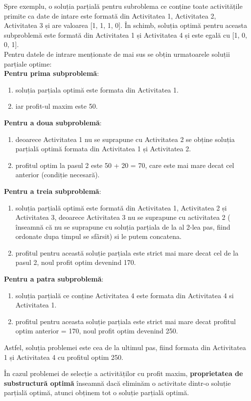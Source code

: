  Spre exemplu, o soluția parțială pentru subroblema ce conține toate activitățile primite ca date de intare este formată din Activitatea 1, Activitatea 2, Activitatea 3 și are valoarea [1, 1, 1, 0]. În schimb, soluția optimă pentru aceasta subproblemă este formată din Activitatea 1 și Activitatea 4 și este egală cu [1, 0, 0, 1]. \\

Pentru datele de intrare menționate de mai sus se obțin urmatoarele soluții parțiale optime:\\
\textbf{Pentru prima subproblemă}:
\begin{enumerate}
    \item soluția parțiala optimă este formata din Activitatea 1.
    \item iar profit-ul maxim este 50. \\
\end{enumerate}
\textbf{Pentru a doua subproblemă}:
\begin{enumerate}
    \item deoarece Activitatea 1 nu se suprapune cu Activitatea 2 se obține soluția parțială optimă formata din Activitatea 1 și Activitatea 2.
    \item profitul optim la pasul 2 este 50 + 20 = 70, care este mai mare decat cel anterior (condiție necesară).
\end{enumerate}
\textbf{Pentru a treia subproblemă}:
\begin{enumerate}
    \item soluția parțială optimă este formată din Activitatea 1, Activitatea 2 și Activitatea 3, deoarece Activitatea 3 nu se suprapune cu activitatea 2 ( înseamnă că nu se suprapune cu soluția parțiala de la al 2-lea pas, fiind ordonate dupa timpul se sfârsit) si le putem concatena.
    \item profitul pentru această soluție parțiala este strict mai mare decat cel de la pasul 2, noul profit optim devenind 170. \\
\end{enumerate}
\textbf{Pentru a patra subproblemă}:
\begin{enumerate}
    \item soluția parțială ce conține Activitatea 4 este formata din Activitatea 4 si Activitatea 1.
    \item profitul pentru aceasta soluție parțiala este strict mai mare decat profitul optim anterior = 170, noul profit optim devenind 250.
\end{enumerate} 
Astfel, soluția problemei este cea de la ultimul pas, fiind formata din Activitatea 1 și Activitatea 4  cu profitul optim 250. 

În cazul problemei de selecție a activităților cu profit maxim, \textbf{proprietatea de substructură optimă} înseamnă dacă eliminăm o activitate dintr-o soluție parțială optimă, atunci obținem tot o soluție parțială optimă.